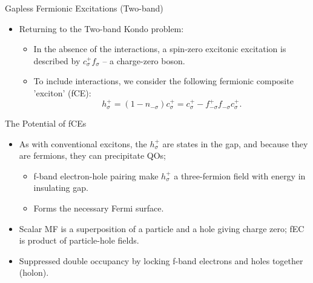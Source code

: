 \documentclass{beamer}
\begin{document}


\begin{frame}{Gapless Fermionic Excitations (Two-band)}
    
    \begin{itemize}
        \item Returning to the Two-band Kondo problem:
            \begin{itemize}
                \item In the absence of the interactions, a spin-zero excitonic excitation is described by $c_{\sigma}^+f_{\sigma}$ -- a charge-zero boson.
                
                \item To include interactions, we consider the following fermionic composite 'exciton' (fCE):
                \[
                    h_{\sigma}^+ = (1-n_{-\sigma})c_{\sigma}^+ = c_{\sigma}^+ - f_{-\sigma}^+f_{-\sigma}c_{\sigma}^+.
                \]
            
            \end{itemize}
        
    \end{itemize}
    
    
    
    
    \begin{figure}[htbp!]%
        \centering
        \qquad
        \label{fig:example}%
    \end{figure}


\end{frame}




\begin{frame}{The Potential of fCEs}
    
    \begin{itemize}
        \item As with conventional excitons, the $h_{\sigma}^+$ are states in the gap, and because they are fermions, they can precipitate QOs;
        \begin{itemize}
            \item f-band electron-hole pairing make $h_{\sigma}^+$ a three-fermion field with energy in insulating gap.
            
            \item Forms the necessary Fermi surface.

        \end{itemize}
        
    \item Scalar MF is a superposition of a particle and a hole giving charge zero; fEC is product of particle-hole fields. 
    
    \item Suppressed double occupancy by locking f-band electrons and holes together (holon). 
        
    \end{itemize}
\end{frame}
\end{document}
